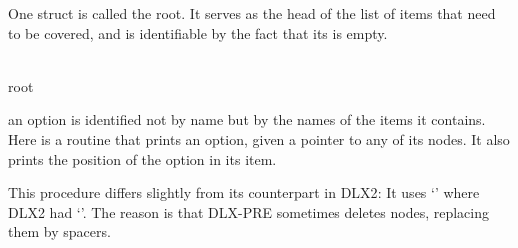 One  struct is called the root. It serves as the head of the
list of items that need to be covered, and is identifiable by the fact
that its  is empty.

\Y\B\4\D\\{root}\5
\par
\fi

an option is identified not by name but by the names of the items it
contains.
Here is a routine that prints an option, given a pointer to any of its
nodes. It also prints the position of the option in its item.

This procedure differs slightly from its counterpart in {\mc DLX2}: It
uses `' where {\mc DLX2} had `'. The reason is that
{\mc DLX-PRE} sometimes deletes nodes, replacing them by spacers.

